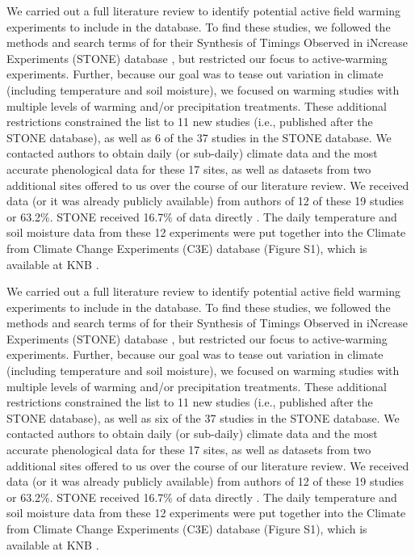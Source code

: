\documentclass{article}
\begin{document}
\par We carried out a full literature review to identify potential active field warming experiments to include in the database. To find these studies, we followed the methods and search terms of \citet{wolkovich2012} for their Synthesis of Timings Observed in iNcrease Experiments (STONE) database \citep{wolkovich2012}, but restricted our focus to active-warming experiments. Further, because our goal was to tease out variation in climate (including temperature and soil moisture), we focused on warming studies with multiple levels of warming and/or precipitation treatments. These additional restrictions constrained the list to 11 new studies (i.e., published after the STONE database), as well as 6 of the 37 studies in the STONE database. We contacted authors to obtain daily (or sub-daily) climate data and the most accurate phenological data for these 17 sites, as well as datasets from two additional sites offered to us over the course of our literature review.  We received data (or it was already publicly available) from authors of 12 of these 19 studies or 63.2\%. STONE received 16.7\% of data directly \citep{wolkovich2012}. The daily temperature and soil moisture data from these 12 experiments were put together into the Climate from Climate Change Experiments (C3E) database (Figure S1), which is available at KNB \citep{ettinger2017}.%

\par We carried out a full literature review to identify potential active field warming experiments to include in the database. To find these studies, we followed the methods and search terms of \citet{wolkovich2012} for their Synthesis of Timings Observed in iNcrease Experiments (STONE) database \citep{wolkovich2012}, but restricted our focus to active-warming experiments. Further, because our goal was to tease out variation in climate (including temperature and soil moisture), we focused on warming studies with multiple levels of warming and/or precipitation treatments. These additional restrictions constrained the list to 11 new studies (i.e., published after the STONE database), as well as six of the 37 studies in the STONE database. We contacted authors to obtain daily (or sub-daily) climate data and the most accurate phenological data for these 17 sites, as well as datasets from two additional sites offered to us over the course of our literature review.  We received data (or it was already publicly available) from authors of 12 of these 19 studies or 63.2\%. STONE received 16.7\% of data directly \citep{wolkovich2012}. The daily temperature and soil moisture data from these 12 experiments were put together into the Climate from Climate Change Experiments (C3E) database (Figure S1), which is available at KNB \citep{ettinger2017}.%
\end{document}
